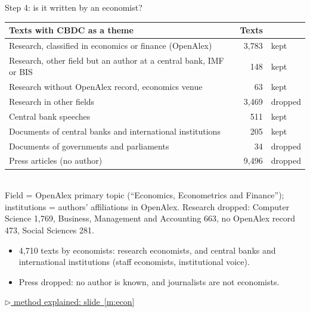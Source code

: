 \documentclass[aspectratio=169,10pt]{beamer}
\newcommand{\method}[1]{\hfill\hyperref[#1]{\tiny\textcolor{c4}{$\triangleright$ method explained: slide~\ref*{#1}}}}
\begin{document}
\begin{frame}{Step 4: is it written by an economist?}
\footnotesize
\begin{tabular}{@{}p{}rl@{}}\toprule
\textbf{Texts with CBDC as a theme} & \textbf{Texts} & \\\midrule
Research, classified in economics or finance (OpenAlex) & 3,783 & kept \\
Research, other field but an author at a central bank, IMF or BIS & 148 & kept \\
Research without OpenAlex record, economics venue & 63 & kept \\
Research in other fields & 3,469 & dropped \\
Central bank speeches & 511 & kept \\
Documents of central banks and international institutions & 205 & kept \\
Documents of governments and parliaments & 34 & dropped \\
Press articles (no author) & 9,496 & dropped \\
\bottomrule\end{tabular}\\[4pt]
\scriptsize Field = OpenAlex primary topic (``Economics, Econometrics and Finance''); institutions = authors' affiliations in OpenAlex. Research dropped: Computer Science 1,769, Business, Management and Accounting 663, no OpenAlex record 473, Social Sciences 281.\\[4pt]
\small
\begin{itemize}\setlength\itemsep{1pt}
\item \alert{4,710 texts by economists}: research economists, and central banks and international institutions (staff economists, institutional voice).
\item Press dropped: no author is known, and journalists are not economists.
\end{itemize}
\method{m:econ}
\end{frame}
\end{document}
